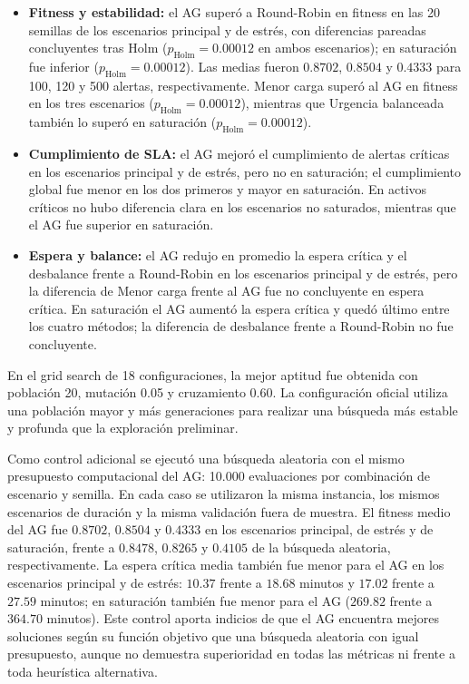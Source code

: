 \documentclass[12pt,a4paper,twocolumn]{article}
\begin{document}
\begin{itemize}
    \item \textbf{Fitness y estabilidad:} el AG superó a Round-Robin en fitness en las 20 semillas de los escenarios principal y de estrés, con diferencias pareadas concluyentes tras Holm ($p_\mathrm{Holm}=0.00012$ en ambos escenarios); en saturación fue inferior ($p_\mathrm{Holm}=0.00012$). Las medias fueron $0.8702$, $0.8504$ y $0.4333$ para 100, 120 y 500 alertas, respectivamente. Menor carga superó al AG en fitness en los tres escenarios ($p_\mathrm{Holm}=0.00012$), mientras que Urgencia balanceada también lo superó en saturación ($p_\mathrm{Holm}=0.00012$).
    \item \textbf{Cumplimiento de SLA:} el AG mejoró el cumplimiento de alertas críticas en los escenarios principal y de estrés, pero no en saturación; el cumplimiento global fue menor en los dos primeros y mayor en saturación. En activos críticos no hubo diferencia clara en los escenarios no saturados, mientras que el AG fue superior en saturación.
    \item \textbf{Espera y balance:} el AG redujo en promedio la espera crítica y el desbalance frente a Round-Robin en los escenarios principal y de estrés, pero la diferencia de Menor carga frente al AG fue no concluyente en espera crítica. En saturación el AG aumentó la espera crítica y quedó último entre los cuatro métodos; la diferencia de desbalance frente a Round-Robin no fue concluyente.
\end{itemize}

En el grid search de 18 configuraciones, la mejor aptitud fue obtenida con población 20, mutación 0.05 y cruzamiento 0.60. La configuración oficial utiliza una población mayor y más generaciones para realizar una búsqueda más estable y profunda que la exploración preliminar.

Como control adicional se ejecutó una búsqueda aleatoria con el mismo presupuesto computacional del AG: 10.000 evaluaciones por combinación de escenario y semilla. En cada caso se utilizaron la misma instancia, los mismos escenarios de duración y la misma validación fuera de muestra. El fitness medio del AG fue $0.8702$, $0.8504$ y $0.4333$ en los escenarios principal, de estrés y de saturación, frente a $0.8478$, $0.8265$ y $0.4105$ de la búsqueda aleatoria, respectivamente. La espera crítica media también fue menor para el AG en los escenarios principal y de estrés: $10.37$ frente a $18.68$ minutos y $17.02$ frente a $27.59$ minutos; en saturación también fue menor para el AG ($269.82$ frente a $364.70$ minutos). Este control aporta indicios de que el AG encuentra mejores soluciones según su función objetivo que una búsqueda aleatoria con igual presupuesto, aunque no demuestra superioridad en todas las métricas ni frente a toda heurística alternativa.
\end{document}
